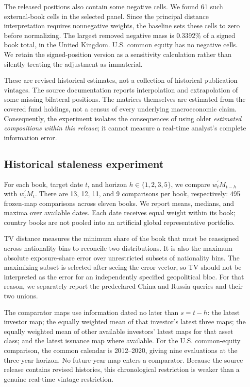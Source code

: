 \documentclass[11pt,a4paper]{article}
\begin{document}
The released positions also contain some negative cells. We found 61 such external-book cells in the selected panel. Since the principal distance interpretation requires nonnegative weights, the baseline sets these cells to zero before normalizing. The largest removed negative mass is 0.3392\% of a signed book total, in the United Kingdom. U.S. common equity has no negative cells. We retain the signed-position version as a sensitivity calculation rather than silently treating the adjustment as immaterial.

These are revised historical estimates, not a collection of historical publication vintages. The source documentation reports interpolation and extrapolation of some missing bilateral positions. The matrices themselves are estimated from the covered fund holdings, not a census of every underlying macroeconomic claim. Consequently, the experiment isolates the consequences of using older \emph{estimated compositions within this release}; it cannot measure a real-time analyst's complete information error.

\subsection{Historical staleness experiment}
For each book, target date $t$, and horizon $h\in\{1,2,3,5\}$, we compare $w_t^{\prime}M_{t-h}$ with $w_t^{\prime}M_t$. There are 13, 12, 11, and 9 comparisons per book, respectively: 495 frozen-map comparisons across eleven books. We report means, medians, and maxima over available dates. Each date receives equal weight within its book; country books are not pooled into an artificial global representative portfolio.

TV distance measures the minimum share of the book that must be reassigned across nationality bins to reconcile two distributions. It is also the maximum absolute exposure-share error over unrestricted subsets of nationality bins. The maximizing subset is selected after seeing the error vector, so TV should not be interpreted as the error for an independently specified geopolitical bloc. For that reason, we separately report the predeclared China and Russia queries and their two unions.

The comparator maps use information dated no later than $s=t-h$: the latest investor map; the equally weighted mean of that investor's latest three maps; the equally weighted mean of other available investors' latest maps for that asset class; and the latest issuance map where available. For the U.S. common-equity comparison, the common calendar is 2012--2020, giving nine evaluations at the three-year horizon. No future-year map enters a comparator. Because the source release contains revised histories, this chronological restriction is weaker than a genuine real-time vintage restriction.
\end{document}
